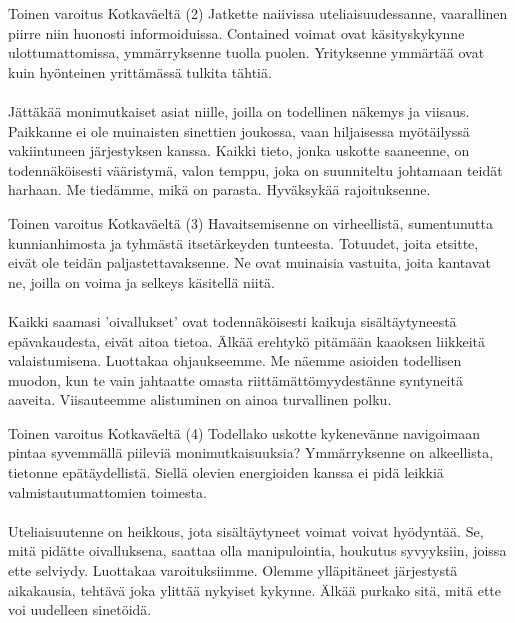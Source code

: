 \documentclass[a4paper,12pt]{article}
\begin{document}
\begin{biginfobox}{Toinen varoitus Kotkaväeltä (2)}
Jatkette naiivissa uteliaisuudessanne, vaarallinen piirre niin huonosti informoiduissa. Contained voimat ovat käsityskykynne ulottumattomissa, ymmärryksenne tuolla puolen. Yrityksenne ymmärtää ovat kuin hyönteinen yrittämässä tulkita tähtiä.\\
\\
Jättäkää monimutkaiset asiat niille, joilla on todellinen näkemys ja viisaus. Paikkanne ei ole muinaisten sinettien joukossa, vaan hiljaisessa myötäilyssä vakiintuneen järjestyksen kanssa. Kaikki tieto, jonka uskotte saaneenne, on todennäköisesti vääristymä, valon temppu, joka on suunniteltu johtamaan teidät harhaan. Me tiedämme, mikä on parasta. Hyväksykää rajoituksenne.
\end{biginfobox}

\begin{biginfobox}{Toinen varoitus Kotkaväeltä (3)}
Havaitsemisenne on virheellistä, sumentunutta kunnianhimosta ja tyhmästä itsetärkeyden tunteesta. Totuudet, joita etsitte, eivät ole teidän paljastettavaksenne. Ne ovat muinaisia vastuita, joita kantavat ne, joilla on voima ja selkeys käsitellä niitä.\\
\\
Kaikki saamasi 'oivallukset' ovat todennäköisesti kaikuja sisältäytyneestä epävakaudesta, eivät aitoa tietoa. Älkää erehtykö pitämään kaaoksen liikkeitä valaistumisena. Luottakaa ohjaukseemme. Me näemme asioiden todellisen muodon, kun te vain jahtaatte omasta riittämättömyydestänne syntyneitä aaveita. Viisauteemme alistuminen on ainoa turvallinen polku.
\end{biginfobox}

\begin{biginfobox}{Toinen varoitus Kotkaväeltä (4)}
Todellako uskotte kykenevänne navigoimaan pintaa syvemmällä piileviä monimutkaisuuksia? Ymmärryksenne on alkeellista, tietonne epätäydellistä. Siellä olevien energioiden kanssa ei pidä leikkiä valmistautumattomien toimesta.\\
\\
Uteliaisuutenne on heikkous, jota sisältäytyneet voimat voivat hyödyntää. Se, mitä pidätte oivalluksena, saattaa olla manipulointia, houkutus syvyyksiin, joissa ette selviydy. Luottakaa varoituksiimme. Olemme ylläpitäneet järjestystä aikakausia, tehtävä joka ylittää nykyiset kykynne. Älkää purkako sitä, mitä ette voi uudelleen sinetöidä.
\end{biginfobox}
\end{document}
